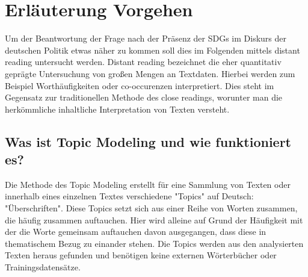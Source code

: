 \documentclass[letterpaper]{article}
\begin{document}
\section{Erläuterung Vorgehen}
Um der Beantwortung der Frage nach der Präsenz der SDGs im Diskurs der deutschen Politik etwas näher zu kommen soll dies im Folgenden mittels distant reading untersucht werden. Distant reading bezeichnet die eher quantitativ geprägte Untersuchung von großen Mengen an Textdaten. Hierbei werden zum Beispiel Worthäufigkeiten oder co-occurenzen interpretiert. Dies steht im Gegensatz zur traditionellen Methode des close readings, worunter man die herkömmliche inhaltliche Interpretation von Texten versteht\cite{Moretti}. 

\subsection{Was ist Topic Modeling und wie funktioniert es?}
Die Methode des Topic Modeling erstellt für eine Sammlung von Texten oder innerhalb eines einzelnen Textes verschiedene "Topics" auf Deutsch: "Überschriften". Diese Topics setzt sich aus einer Reihe von Worten zusammen, die häufig zusammen auftauchen. Hier wird alleine auf Grund der Häufigkeit mit der die Worte gemeinsam auftauchen davon ausgegangen, dass diese in thematischem Bezug zu einander stehen. Die Topics werden aus den analysierten Texten heraus gefunden und benötigen keine externen Wörterbücher oder Trainingsdatensätze. 
\end{document}
